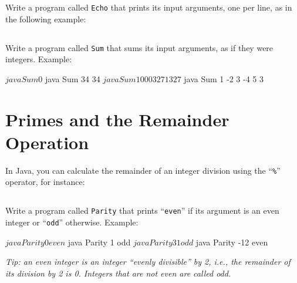 \documentclass[a4paper, 12pt]{article}
\begin{document}
Write a program called \texttt{Echo} that prints its input arguments, one per
line, as in the following example:



\subsection{}

Write a program called \texttt{Sum} that sums its input arguments, as if they
were integers. Example:

\begin{cmd}
$ java Sum
0
$ java Sum 34
34
$ java Sum 1000 327
1327
$ java Sum 1 -2 3 -4 5
3
\end{cmd}


\section{Primes and the Remainder Operation}

In Java, you can calculate the remainder of an integer division using the
``\texttt{\%}'' operator, for instance:


\subsection{}

Write a program called \texttt{Parity} that prints ``\texttt{even}'' if its
argument is an even integer or ``\texttt{odd}'' otherwise.  Example:

\begin{cmd}
$ java Parity 0
even
$ java Parity 1
odd
$ java Parity 31
odd
$ java Parity -12
even
\end{cmd}

\textsl{Tip: an \emph{even} integer is an integer ``evenly divisible'' by 2,
i.e., the remainder of its division by 2 is 0. Integers that are not even are
called \emph{odd}.}


\subsection{}
\end{document}
